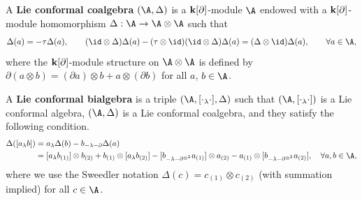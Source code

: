 \documentclass[12pt]{amsart}
\begin{document}
    \begin{definition} \cite{L}
        A {\bf Lie conformal coalgebra} $(\A,\Delta)$ is a ${\bf k}[\partial]$-module $\A$  endowed with a ${\bf k}[\partial]$-module homomorphism $\Delta: \A\rightarrow \A\otimes \A$ such that
        \begin{align*}
            \Delta(a)=-\tau\Delta(a),\qquad (\id\otimes \Delta)\Delta(a)-(\tau\otimes \id)(\id\otimes \Delta)\Delta(a)=(\Delta\otimes \id)\Delta(a),\qquad   \forall a\in \A,
        \end{align*}
        where the ${\bf k}[\partial] $-module structure on $\A\otimes \A$ is defined by $\partial(a\otimes b)=(\partial a)\otimes b+a\otimes (\partial b)$ for all $a$, $b\in \A$.

        A {\bf Lie conformal bialgebra}  is a triple $(\A,[\cdot_\lambda \cdot],\Delta)$ such that $(\A,[\cdot_\lambda \cdot])$ is a Lie conformal algebra, $(\A,\Delta)$ is a Lie conformal coalgebra, and they satisfy the following condition.
        \begin{align*}
            \Delta([a_\lambda b])&=      a_\lambda\Delta(b)-b_{-\lambda-\partial}\Delta(a)\\
            &= [a_\lambda b_{(1)}]\otimes b_{(2)}+ b_{(1)}\otimes [a_\lambda b_{(2)}]-[b_{-\lambda-\partial^{\otimes^2}} a_{(1)}]\otimes a_{(2)}- a_{(1)}\otimes [b_{-\lambda-\partial^{\otimes^2}} a_{(2)}],~~~ \forall a,b\in \A,
        \end{align*}
        where we use the Sweedler notation $\Delta(c)=c_{(1)}\otimes c_{(2)}$ (with summation implied) for all $c\in \A$.
       
    \end{definition}
\end{document}
